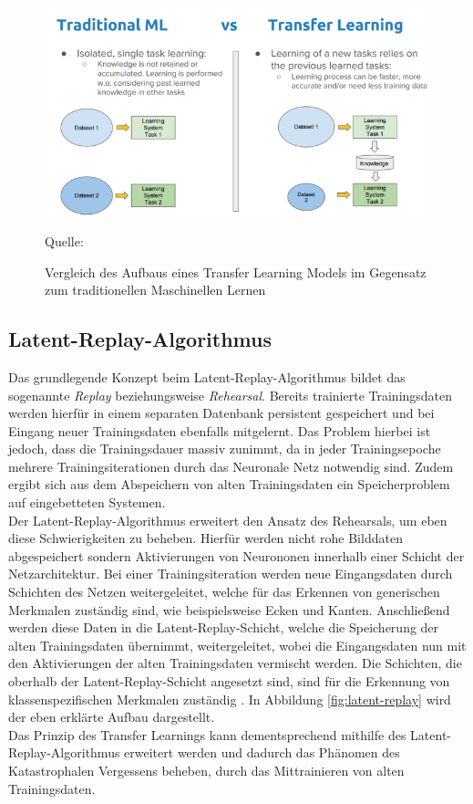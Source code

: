 \documentclass[oneside]{ausarbeitung}
\begin{document}
\begin{figure}[hptb]
	\centering
	\includegraphics[height=0.4\textheight]{images/traditional-vs-tflearning.png}
	\caption{Vergleich des Aufbaus eines Transfer Learning Models im Gegensatz zum traditionellen Maschinellen Lernen} Quelle: \cite{Sarkar2019}
	\label{fig:tf-architecture}
\end{figure}

\subsection{Latent-Replay-Algorithmus}
Das grundlegende Konzept beim Latent-Replay-Algorithmus bildet das sogenannte \textit{Replay} beziehungsweise \textit{Rehearsal}. Bereits trainierte Trainingsdaten werden hierfür in einem separaten Datenbank persistent gespeichert und bei Eingang neuer Trainingsdaten ebenfalls mitgelernt.
Das Problem hierbei ist jedoch, dass die Trainingsdauer massiv zunimmt, da in jeder Trainingsepoche mehrere Trainingsiterationen durch das Neuronale Netz notwendig sind. Zudem ergibt sich aus dem Abspeichern von alten Trainingsdaten ein Speicherproblem auf eingebetteten Systemen.\\
Der Latent-Replay-Algorithmus erweitert den Ansatz des Rehearsals, um eben diese Schwierigkeiten zu beheben. Hierfür werden nicht rohe Bilddaten abgespeichert sondern Aktivierungen von Neurononen innerhalb einer Schicht der Netzarchitektur. Bei einer Trainingsiteration werden neue Eingangsdaten durch Schichten des Netzen weitergeleitet, welche für das Erkennen von generischen Merkmalen zuständig sind, wie beispielsweise Ecken und Kanten. Anschließend werden diese Daten in die Latent-Replay-Schicht, welche die Speicherung der alten Trainingsdaten übernimmt, weitergeleitet, wobei die Eingangsdaten nun mit den Aktivierungen der alten Trainingsdaten vermischt werden. Die Schichten, die oberhalb der Latent-Replay-Schicht angesetzt sind, sind für die Erkennung von klassenspezifischen Merkmalen zuständig \cite{Pellegrini2019}. In Abbildung \ref{fig:latent-replay} wird der eben erklärte Aufbau dargestellt.\\
Das Prinzip des Transfer Learnings kann dementsprechend mithilfe des Latent-Replay-Algorithmus erweitert werden und dadurch das Phänomen des Katastrophalen Vergessens beheben, durch das Mittrainieren von alten Trainingsdaten.
\end{document}

